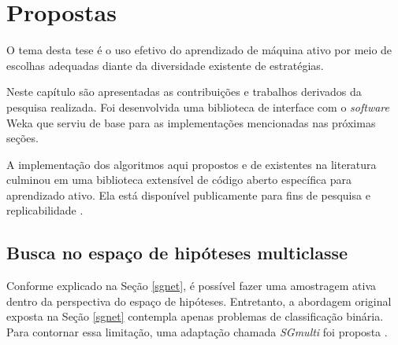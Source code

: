 \chapter{Propostas} \label{propostas}

O tema desta tese é o uso efetivo do aprendizado de máquina ativo por meio de escolhas
adequadas diante da diversidade existente de estratégias.



Neste capítulo são apresentadas as contribuições e trabalhos derivados da pesquisa
realizada.
Foi desenvolvida uma biblioteca \citep{doi/ml} de interface com o
\textit{software} Weka
que serviu de base para as implementações mencionadas nas próximas seções.



A implementação dos algoritmos aqui propostos e de existentes na literatura
culminou em uma biblioteca extensível de código aberto específica para aprendizado ativo.
Ela está disponível publicamente para fins de pesquisa e replicabilidade \citep{doi/al}.


\section{Busca no espaço de hipóteses multiclasse}
Conforme explicado na Seção \ref{sgnet},
é possível fazer uma amostragem ativa dentro
da perspectiva do espaço de hipóteses.
Entretanto, a abordagem original exposta na Seção \ref{sgnet}
contempla apenas problemas de classificação binária.
Para contornar essa limitação, uma adaptação chamada \textit{SGmulti}
foi proposta \citep{conf/hais/SantosC14}.

